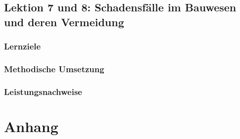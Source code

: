 \documentclass[
11pt,
captions=tableheading,
smallheadings,
headsepline,
footsepline, 
captions=tableheading,
parskip=half-,
]{scrartcl}
\begin{document}
\subsection{Lektion 7 und 8: Schadensfälle im Bauwesen und deren Vermeidung}
\subsubsection{Lernziele}
\subsubsection{Methodische Umsetzung}
\subsubsection{Leistungsnachweise}





\clearpage
{}

\printbibliography

\clearpage
\appendix

\section{Anhang}
%
\end{document}
